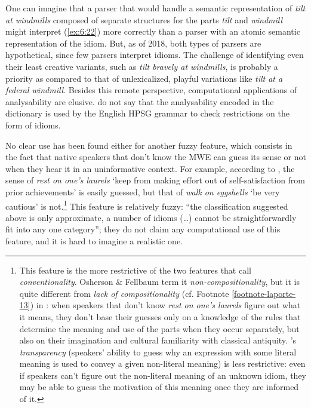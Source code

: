 \documentclass[output=paper]{langsci/langscibook}
\begin{document}
\begin{exe}
\end{exe}
	

\noindent One can imagine that a parser that would handle a semantic representation of\textit{ tilt at windmills} composed of separate structures for the parts \textit{tilt} and \textit{windmill} might interpret (\ref{ex:6:22}) more correctly than a parser with an atomic semantic representation of the idiom. But, as of 2018, both types of parsers are hypothetical, since few parsers interpret idioms. The challenge of identifying even their least creative variants, such as \textit{tilt bravely at windmills}, is probably a priority as compared to that of unlexicalized, playful variations like \textit{tilt at a federal windmill}. Besides this remote perspective, computational applications of analysability are elusive. \cite{Bond} do not say that the analysability encoded in the dictionary is used by the English HPSG  grammar to check restrictions on the form of idioms.

No clear use has been found either for another fuzzy feature, which consists in the fact that native speakers that don’t know the MWE can guess its sense or not when they hear it in an uninformative context. For example, according to   \citet[3]{Osherson2010}, the sense of\textit{ rest on one’s laurels} ‘keep from making effort out of self-satisfaction from prior achievements’ is easily guessed, but that of \textit{walk on eggshells} ‘be very cautious’ is not.\footnote{This feature is the more restrictive of the two features that \citet[495]{Nunberg1994} call \textit{conventionality}. 
Osherson \& Fellbaum term it \textit{non-compositionality}, but it is quite different from \textit{lack of compositionality} (cf. Footnote \ref{footnote-laporte-13}) in \citet[128--129]{Danlos1988}: when speakers that don’t know \textit{rest on one’s laurels} figure out what it means, they don’t base their guesses only on a knowledge of the rules that determine the meaning and use of the parts when they occur separately, but also on their imagination and cultural familiarity with classical antiquity. \citet[496–497]{Nunberg1994}’s  \textit{transparency} (speakers’ ability to guess why an expression with some literal meaning is used to convey a given non-literal meaning) is less restrictive: even if speakers can’t figure out the non-literal meaning of an unknown idiom, they may be able to guess the motivation of this meaning once they are informed of it.}  This feature is relatively fuzzy: “the classification suggested above is only approximate, a number of idioms (\ldots) cannot be  straightforwardly fit into any one category”; they do not claim any computational use of this feature, and it is hard to imagine a realistic one.
\end{document}
